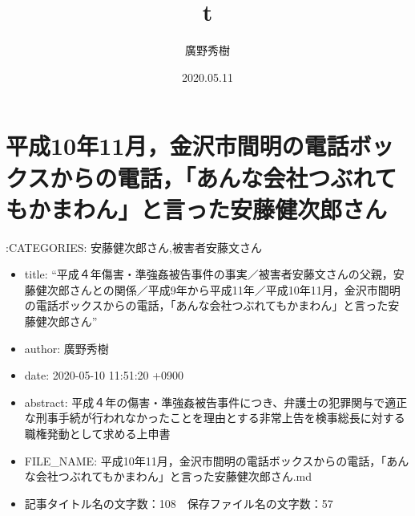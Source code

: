\documentclass[]{ltjarticle}
\providecommand{\tightlist}{%
  \setlength{\itemsep}{0pt}\setlength{\parskip}{0pt}}
\begin{document}
\tableofcontents \newpage

\title{t}
\author{廣野秀樹}
\date{2020.05.11}
\maketitle




\hypertarget{ux5e73ux621010ux5e7411ux6708ux91d1ux6ca2ux5e02ux9593ux660eux306eux96fbux8a71ux30dcux30c3ux30afux30b9ux304bux3089ux306eux96fbux8a71ux3042ux3093ux306aux4f1aux793eux3064ux3076ux308cux3066ux3082ux304bux307eux308fux3093ux3068ux8a00ux3063ux305fux5b89ux85e4ux5065ux6b21ux90ceux3055ux3093}{%
\section{平成10年11月，金沢市間明の電話ボックスからの電話，「あんな会社つぶれてもかまわん」と言った安藤健次郎さん}\label{ux5e73ux621010ux5e7411ux6708ux91d1ux6ca2ux5e02ux9593ux660eux306eux96fbux8a71ux30dcux30c3ux30afux30b9ux304bux3089ux306eux96fbux8a71ux3042ux3093ux306aux4f1aux793eux3064ux3076ux308cux3066ux3082ux304bux307eux308fux3093ux3068ux8a00ux3063ux305fux5b89ux85e4ux5065ux6b21ux90ceux3055ux3093}}

:CATEGORIES: 安藤健次郎さん,被害者安藤文さん

\begin{itemize}
\tightlist
\item
  title:
  ``平成４年傷害・準強姦被告事件の事実／被害者安藤文さんの父親，安藤健次郎さんとの関係／平成9年から平成11年／平成10年11月，金沢市間明の電話ボックスからの電話，「あんな会社つぶれてもかまわん」と言った安藤健次郎さん''
\item
  author: 廣野秀樹
\item
  date: 2020-05-10 11:51:20 +0900
\item
  abstract:
  平成４年の傷害・準強姦被告事件につき、弁護士の犯罪関与で適正な刑事手続が行われなかったことを理由とする非常上告を検事総長に対する職権発動として求める上申書
\item
  FILE\_NAME:
  平成10年11月，金沢市間明の電話ボックスからの電話，「あんな会社つぶれてもかまわん」と言った安藤健次郎さん.md
\item
  記事タイトル名の文字数：108　保存ファイル名の文字数：57
\end{itemize}
\end{document}
